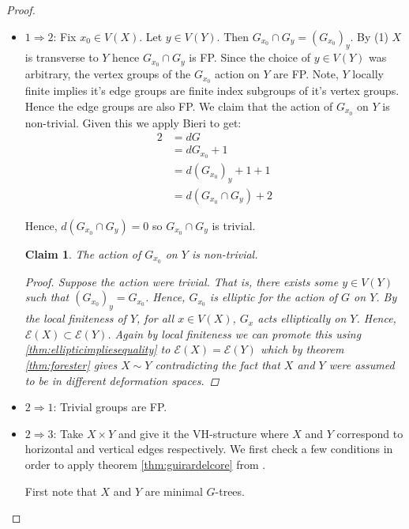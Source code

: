 \documentclass{article}
\theoremstyle{mystyle}
\newtheorem*{claim*}{Claim}
\theoremstyle{remark}
\begin{document}
\begin{proof}
\begin{itemize}
    \item
    
    $1\Rightarrow 2$: Fix $x_0 \in V(X)$. Let $y\in V(Y)$. Then $G_{x_0} \cap G_y = (G_{x_0})_y$. By (1) $X$ is transverse to $Y$ hence $G_{x_0}\cap G_y$ is FP. Since the choice of $y\in V(Y)$ was arbitrary, the vertex groups of the $G_{x_0}$ action on $Y$ are FP. Note, $Y$ locally finite implies it's edge groups are finite index subgroups of it's vertex groups. Hence the edge groups are also FP. We claim that the action of $G_{x_0}$ on $Y$ is non-trivial. Given this we apply Bieri to get:
    \begin{align*}
        2 &= dG\\
          &= dG_{x_0}+1\\
          &= d( G_{x_0} )_y+1+1\\
          &= d(G_{x_0}\cap G_y)+2
    \end{align*}
    
    Hence, $d(G_{x_0}\cap G_y)=0$ so $G_{x_0}\cap G_y$ is trivial.
    
    \begin{claim*}
    The action of $G_{x_0}$ on $Y$ is non-trivial.
    \begin{proof}
        Suppose the action were trivial. That is, there exists some $y\in V(Y)$ such that $(G_{x_0})_y=G_{x_0}$. Hence, $G_{x_0}$ is elliptic for the action of $G$ on $Y$. By the local finiteness of $Y$, for all $x\in V(X)$, $G_x$ acts elliptically on $Y$. Hence, $\mathcal{E}(X)\subset \mathcal{E}(Y)$. Again by local finiteness we can promote this using \ref{thm:ellipticimpliesequality} to $\mathcal{E}(X) = \mathcal{E}(Y)$ which by theorem \ref{thm:forester} gives $X \sim Y$  contradicting the fact that $X$ and $Y$ were assumed to be in different deformation spaces.
    \end{proof}
    \end{claim*}
    \item $2\Rightarrow 1$: Trivial groups are FP.
    \item $2\Rightarrow 3$: Take $X \times Y$ and give it the VH-structure where $X$ and $Y$ correspond to horizontal and vertical edges respectively. We first check a few conditions in order to apply theorem \ref{thm:guirardelcore} from \cite{guirardelcorepaper}. 
    
    First note that $X$ and $Y$ are minimal $G$-trees. 
    

\end{itemize}
\end{proof}
\end{document}
